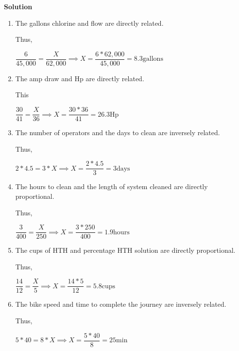 \textbf{Solution}
\begin{enumerate}
\item The gallons chlorine and flow are directly related. 

Thus,

$\dfrac{6}{45,000}=\dfrac{X}{62,000} \implies X=\dfrac{6*62,000}{45,000}=8.3 \mathrm{gallons}$


\vspace{0.5cm}

\item The amp draw and Hp are directly related.

This

$\dfrac{30}{41}=\dfrac{X}{36} \implies X=\dfrac{30*36}{41}=26.3 \mathrm{Hp}$

\vspace{0.5cm}

\item The number of operators and the days to clean are inversely related.

Thus,

$2 * 4.5 = 3*X \implies X = \dfrac{2*4.5}{3} = 3 \mathrm{days}$



\vspace{0.5cm}

\item The hours to clean and the length of system cleaned are directly proportional.

Thus,

$\dfrac{3}{400}=\dfrac{X}{250} \implies X=\dfrac{3*250}{400}=1.9 \mathrm{hours}$

\vspace{0.5cm}

\item The cups of HTH and percentage HTH solution are directly proportional.

Thus,

$\dfrac{14}{12}=\dfrac{X}{5} \implies X=\dfrac{14*5}{12}=5.8 \mathrm{cups}$

\vspace{0.3cm}

\item The bike speed and time to complete the journey are inversely related.

Thus,

$5 * 40 = 8*X \implies X = \dfrac{5*40}{8} = 25 \mathrm{min}$

\end{enumerate}

\vspace{1cm}

